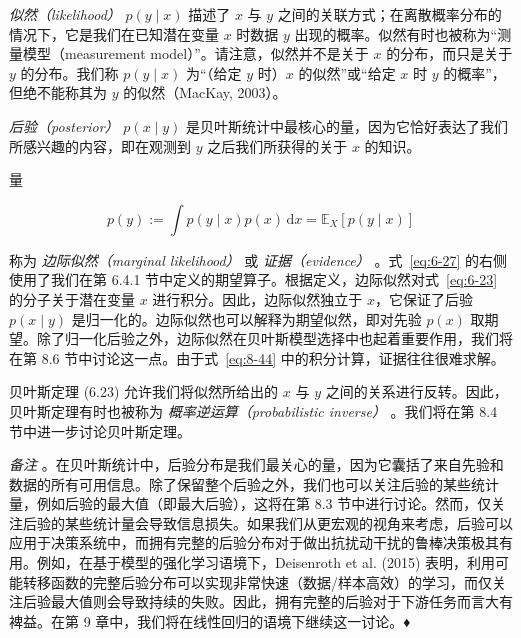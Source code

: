 \emph{似然（likelihood）} $ p(y \mid x) $ 描述了 $ x $ 与 $ y $ 之间的关联方式；在离散概率分布的情况下，它是我们在已知潜在变量 $ x $ 时数据 $ y $ 出现的概率。似然有时也被称为“测量模型（measurement model）”。请注意，似然并不是关于 $ x $ 的分布，而只是关于 $ y $ 的分布。我们称 $ p(y \mid x) $ 为“（给定 $ y $ 时）$ x $ 的似然”或“给定 $ x $ 时 $ y $ 的概率”，但绝不能称其为 $ y $ 的似然（MacKay, 2003）。

\emph{后验（posterior）} $ p(x \mid y) $ 是贝叶斯统计中最核心的量，因为它恰好表达了我们所感兴趣的内容，即在观测到 $ y $ 之后我们所获得的关于 $ x $ 的知识。

量

\begin{equation}
p(y) := \int p(y \mid x) p(x)\,\mathrm{d}x = \mathbb{E}_X [p(y \mid x)]
\tag{6.27}\label{eq:6-27}
\end{equation}

称为 \emph{边际似然（marginal likelihood）} 或 \emph{证据（evidence）} 。式~\eqref{eq:6-27} 的右侧使用了我们在第 6.4.1 节中定义的期望算子。根据定义，边际似然对式~\eqref{eq:6-23} 的分子关于潜在变量 $ x $ 进行积分。因此，边际似然独立于 $ x $，它保证了后验 $ p(x \mid y) $ 是归一化的。边际似然也可以解释为期望似然，即对先验 $ p(x) $ 取期望。除了归一化后验之外，边际似然在贝叶斯模型选择中也起着重要作用，我们将在第 8.6 节中讨论这一点。由于式~\eqref{eq:8-44} 中的积分计算，证据往往很难求解。

贝叶斯定理 (6.23) 允许我们将似然所给出的 $ x $ 与 $ y $ 之间的关系进行反转。因此，贝叶斯定理有时也被称为 \emph{概率逆运算（probabilistic inverse）} 。我们将在第 8.4 节中进一步讨论贝叶斯定理。

\emph{备注} 。在贝叶斯统计中，后验分布是我们最关心的量，因为它囊括了来自先验和数据的所有可用信息。除了保留整个后验之外，我们也可以关注后验的某些统计量，例如后验的最大值（即最大后验），这将在第 8.3 节中进行讨论。然而，仅关注后验的某些统计量会导致信息损失。如果我们从更宏观的视角来考虑，后验可以应用于决策系统中，而拥有完整的后验分布对于做出抗扰动干扰的鲁棒决策极其有用。例如，在基于模型的强化学习语境下，Deisenroth et al. (2015) 表明，利用可能转移函数的完整后验分布可以实现非常快速（数据/样本高效）的学习，而仅关注后验最大值则会导致持续的失败。因此，拥有完整的后验对于下游任务而言大有裨益。在第 9 章中，我们将在线性回归的语境下继续这一讨论。♦

